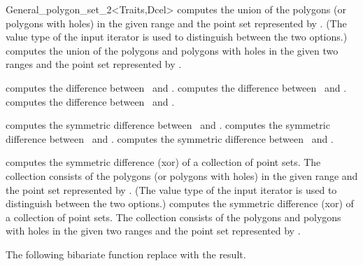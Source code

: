 \begin{ccRefClass}{General_polygon_set_2<Traits,Dcel>}
  {computes the union of the polygons (or polygons with holes) in the 
   given range and the point set represented by \ccVar. (The value type 
   of the input iterator is used to distinguish between the two options.)}
\ccGlue
{}
  {computes the union of the polygons and polygons with holes in the 
   given two ranges and the point set represented by \ccVar.}

  {computes the difference between \ccVar\ and .}
\ccGlue
{}
  {computes the difference between \ccVar\ and .}
\ccGlue
{}
  {computes the difference between \ccVar\ and .}

  {computes the symmetric difference between \ccVar\ and .}
\ccGlue
{}
  {computes the symmetric difference between \ccVar\ and .}
\ccGlue
{}
  {computes the symmetric difference between \ccVar\ and .}

  {computes the symmetric difference (xor) of a collection of point sets.
   The collection consists of the polygons (or polygons with holes) in the 
   given range and the point set represented by \ccVar. (The value type of 
   the input iterator is used to distinguish between the two options.)}
\ccGlue
{}
  {computes the symmetric difference (xor) of a collection of point sets.
   The collection consists of the polygons and polygons with holes in the
   given two ranges and the point set represented by \ccVar.}

The following bibariate function replace  with the result.


\end{ccRefClass}
